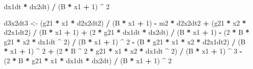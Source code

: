 \documentclass[12pt,twoside,openany]{reedthesis}
\newenvironment{Shaded}{\begin{snugshade}}{\end{snugshade}}
\newcommand{\DecValTok}[1]{\textcolor[rgb]{0.00,0.00,0.81}{#1}}
\newcommand{\NormalTok}[1]{#1}
\newcommand{\OperatorTok}[1]{\textcolor[rgb]{0.81,0.36,0.00}{\textbf{#1}}}
\newcommand{\StringTok}[1]{\textcolor[rgb]{0.31,0.60,0.02}{#1}}
\begin{document}
\begin{Shaded}
\begin{Highlighting}[]
\StringTok{  }\NormalTok{dx1dt }\OperatorTok{*}\StringTok{ }\NormalTok{dx2dt) }\OperatorTok{/}\StringTok{ }\NormalTok{(B }\OperatorTok{*}\StringTok{ }\NormalTok{x1 }\OperatorTok{+}\StringTok{ }\DecValTok{1}\NormalTok{) }\OperatorTok{^}\StringTok{ }\DecValTok{2}
  
\NormalTok{  d3x2dt3 <-}
\StringTok{  }\NormalTok{(g21 }\OperatorTok{*}\StringTok{ }\NormalTok{x1 }\OperatorTok{*}\StringTok{ }\NormalTok{d2x2dt2) }\OperatorTok{/}\StringTok{ }\NormalTok{(B }\OperatorTok{*}\StringTok{ }\NormalTok{x1 }\OperatorTok{+}\StringTok{ }\DecValTok{1}\NormalTok{) }\OperatorTok{-}\StringTok{ }\NormalTok{m2 }\OperatorTok{*}\StringTok{ }\NormalTok{d2x2dt2 }\OperatorTok{+}\StringTok{ }\NormalTok{(g21 }\OperatorTok{*}\StringTok{ }\NormalTok{x2 }\OperatorTok{*}\StringTok{ }\NormalTok{d2x1dt2) }\OperatorTok{/}
\StringTok{  }\NormalTok{(B }\OperatorTok{*}\StringTok{ }\NormalTok{x1 }\OperatorTok{+}\StringTok{ }\DecValTok{1}\NormalTok{) }\OperatorTok{+}\StringTok{ }\NormalTok{(}\DecValTok{2} \OperatorTok{*}\StringTok{ }\NormalTok{g21 }\OperatorTok{*}\StringTok{ }\NormalTok{dx1dt }\OperatorTok{*}\StringTok{ }\NormalTok{dx2dt) }\OperatorTok{/}\StringTok{ }\NormalTok{(B }\OperatorTok{*}\StringTok{ }\NormalTok{x1 }\OperatorTok{+}\StringTok{ }\DecValTok{1}\NormalTok{) }\OperatorTok{-}\StringTok{ }\NormalTok{(}\DecValTok{2} \OperatorTok{*}\StringTok{ }\NormalTok{B }\OperatorTok{*}\StringTok{ }\NormalTok{g21 }\OperatorTok{*}
\StringTok{  }\NormalTok{x2 }\OperatorTok{*}\StringTok{ }\NormalTok{dx1dt }\OperatorTok{^}\StringTok{ }\DecValTok{2}\NormalTok{) }\OperatorTok{/}\StringTok{ }\NormalTok{(B }\OperatorTok{*}\StringTok{ }\NormalTok{x1 }\OperatorTok{+}\StringTok{ }\DecValTok{1}\NormalTok{) }\OperatorTok{^}\StringTok{ }\DecValTok{2} \OperatorTok{-}\StringTok{ }\NormalTok{(B }\OperatorTok{*}\StringTok{ }\NormalTok{g21 }\OperatorTok{*}\StringTok{ }\NormalTok{x1 }\OperatorTok{*}\StringTok{ }\NormalTok{x2 }\OperatorTok{*}\StringTok{ }\NormalTok{d2x1dt2) }\OperatorTok{/}\StringTok{ }\NormalTok{(B }\OperatorTok{*}
\StringTok{  }\NormalTok{x1 }\OperatorTok{+}\StringTok{ }\DecValTok{1}\NormalTok{) }\OperatorTok{^}\StringTok{ }\DecValTok{2} \OperatorTok{+}\StringTok{ }\NormalTok{(}\DecValTok{2} \OperatorTok{*}\StringTok{ }\NormalTok{B }\OperatorTok{^}\StringTok{ }\DecValTok{2} \OperatorTok{*}\StringTok{ }\NormalTok{g21 }\OperatorTok{*}\StringTok{ }\NormalTok{x1 }\OperatorTok{*}\StringTok{ }\NormalTok{x2 }\OperatorTok{*}\StringTok{ }\NormalTok{dx1dt }\OperatorTok{^}\StringTok{ }\DecValTok{2}\NormalTok{) }\OperatorTok{/}\StringTok{ }\NormalTok{(B }\OperatorTok{*}\StringTok{ }\NormalTok{x1 }\OperatorTok{+}\StringTok{ }\DecValTok{1}\NormalTok{) }\OperatorTok{^}\StringTok{ }\DecValTok{3} \OperatorTok{-}\StringTok{ }\NormalTok{(}\DecValTok{2} \OperatorTok{*}
\StringTok{  }\NormalTok{B }\OperatorTok{*}\StringTok{ }\NormalTok{g21 }\OperatorTok{*}\StringTok{ }\NormalTok{x1 }\OperatorTok{*}\StringTok{ }\NormalTok{dx1dt }\OperatorTok{*}\StringTok{ }\NormalTok{dx2dt) }\OperatorTok{/}\StringTok{ }\NormalTok{(B }\OperatorTok{*}\StringTok{ }\NormalTok{x1 }\OperatorTok{+}\StringTok{ }\DecValTok{1}\NormalTok{) }\OperatorTok{^}\StringTok{ }\DecValTok{2}
  

\end{Highlighting}
\end{Shaded}
\end{document}
